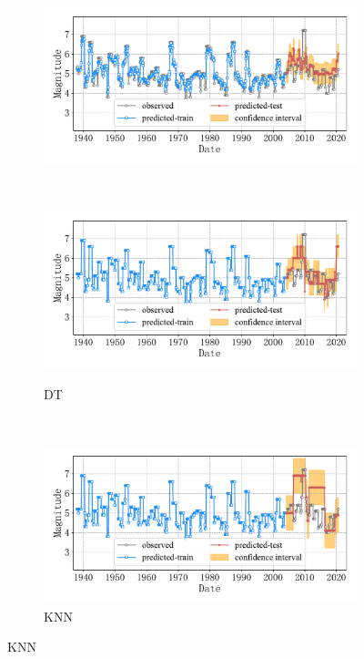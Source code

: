 \begin{figure}[!htbp]
\begin{subfigure}[b]{0.45\textwidth}
    \includegraphics[width=\textwidth]{Img/chap5_seism/block5/seism_gbr_minyear_1932_maxyear_2021_spanlat_2_spanlon_4_timewindow_72_nextmonth_12_minmag_3.0_block_5.pdf}
    \vspace{-1cm}
    \label{fig:seism_gbr_minyear_1932_maxyear_2021_spanlat_2_spanlon_4_timewindow_72_nextmonth_12_minmag_3.0_block_5}
  \end{subfigure}
  ~
  \begin{subfigure}[b]{0.45\textwidth}
    \caption{DT}
    \vspace{-0.2cm}
    \includegraphics[width=\textwidth]{Img/chap5_seism/block5/seism_dt_minyear_1932_maxyear_2021_spanlat_2_spanlon_4_timewindow_72_nextmonth_12_minmag_3.0_block_5.pdf}
    \vspace{-1cm}
    \label{fig:seism_dt_minyear_1932_maxyear_2021_spanlat_2_spanlon_4_timewindow_72_nextmonth_12_minmag_3.0_block_5}
  \end{subfigure}
  \\
  \begin{subfigure}[b]{0.45\textwidth}
    \caption{KNN}
    \vspace{-0.2cm}
    \includegraphics[width=\textwidth]{Img/chap5_seism/block5/seism_kn_minyear_1932_maxyear_2021_spanlat_2_spanlon_4_timewindow_72_nextmonth_12_minmag_3.0_block_5.pdf}

\end{subfigure}
\end{figure}
